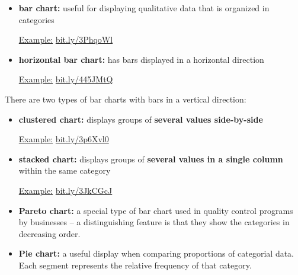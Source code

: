 \documentclass[12pt, letterpaper]{article}
\theoremstyle{definition}
\begin{document}
\begin{defn}
\begin{itemize}

\item \textbf{bar chart:}  useful for displaying qualitative data that is organized in categories

\underline{Example:}  \href{bit.ly/3PhqoWl}{bit.ly/3PhqoWl}



\item \textbf{horizontal bar chart:}  has bars displayed in a horizontal direction

\underline{Example:}  \href{bit.ly/445JMtQ}{bit.ly/445JMtQ}

\end{itemize}

\noindent There are two types of bar charts with bars in a vertical direction:

\begin{itemize}

\item \textbf{clustered chart:}  displays groups of \textbf{several values side-by-side}

\underline{Example:}  \href{bit.ly/3p6Xvl0}{bit.ly/3p6Xvl0}



\item \textbf{stacked chart:}  displays groups of \textbf{several values in a single column} within the same category

\underline{Example:}  \href{bit.ly/3JkCGcJ}{bit.ly/3JkCGcJ}


\end{itemize}
\end{defn}


\begin{defn}

\begin{itemize}

\item \textbf{Pareto chart:}  a special type of bar chart used in quality control programs by businesses -- a distinguishing feature is that they show the categories in decreasing order.

\item \textbf{Pie chart:}  a useful display when comparing proportions of categorial data.  Each segment represents the relative frequency of that category.

\end{itemize}

\end{defn}
\end{document}
